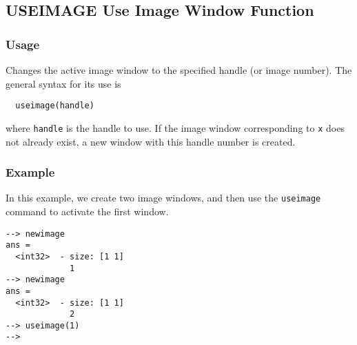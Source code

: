 %
%
%
\subsection{USEIMAGE Use Image Window Function}
\subsubsection{Usage}
Changes the active image window to the specified handle (or image number).  
The general syntax for its use is 
\begin{verbatim}
  useimage(handle)
\end{verbatim}
where \verb|handle| is the handle to use.  If the image window corresponding to
\verb|x| does not already exist, a new window with this handle number is 
created.
\subsubsection{Example}
In this example, we create two image windows, and then use the \verb|useimage|
command to activate the first window.
\begin{verbatim}
--> newimage
ans =
  <int32>  - size: [1 1]
             1
--> newimage
ans =
  <int32>  - size: [1 1]
             2
--> useimage(1)
-->
\end{verbatim}
